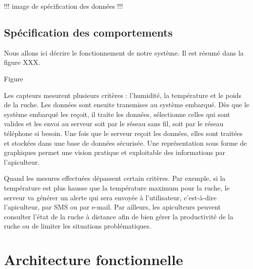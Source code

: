 !!!  image de spécification des données  !!!

\section{Spécification des comportements}

Nous allons ici décrire le fonctionnement de notre système. Il est résumé dans la figure XXX.

Figure

Les capteurs mesurent plusieurs critères : l'humidité, la température et le poids de la ruche. Les données sont ensuite transmises au système embarqué. Dès que le système embarqué les reçoit, il traite les données, sélectionne celles qui sont valides et les envoi au serveur soit par le réseau sans fil, soit par le réseau téléphone si besoin. Une fois que le serveur reçoit les données, elles sont traitées et stockées dans une base de données sécurisée. Une représentation sous forme de graphiques permet une vision pratique et exploitable des informations par l'apiculteur.

Quand les mesures effectuées dépassent certain critères. Par exemple, si la température est plus hausse que la température maximum pour la ruche, le serveur va générer un alerte qui sera envoyée à l’utilisateur, c’est-à-dire l’apiculteur, par SMS ou par e-mail. Par ailleurs, les apiculteurs peuvent consulter l’état de la ruche à distance afin de bien gérer la productivité de la ruche ou de limiter les situations problématiques. 


\chapter{Architecture fonctionnelle}


